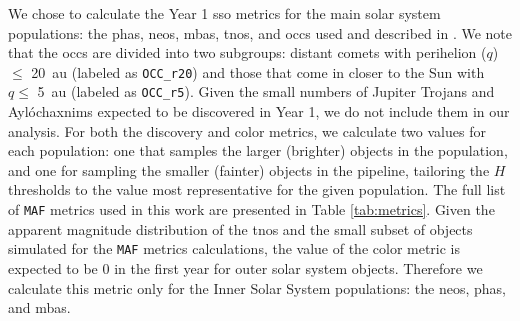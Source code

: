 \documentclass[preprintm,linenumbers]{aastex631}
\newcommand{\maf}{\texttt{MAF}\xspace}
\newcommand{\occrfive}{\texttt{OCC\_r5}\xspace}
\newcommand{\occrtwenty}{\texttt{OCC\_r20}\xspace}
\begin{document}
We chose to calculate the Year 1 \gls*{sso} metrics for the main solar system populations: the \glspl*{pha}, \glspl*{neo}, \glspl*{mba}, \glspl*{tno}, and \glspl*{occ} used and described in \cite{schwambTuningLegacySurvey2023}. 
We note that the \glspl*{occ} are divided into two subgroups: distant comets with perihelion ($q$) $\le$ 20\ au (labeled as \occrtwenty) and those that come in closer to the Sun with $q \le$ 5\ au (labeled as \occrfive). %
Given the small numbers of Jupiter Trojans and \textquotesingle Ayl\'{o}\textquotesingle chaxnims \citep[Inner Venus objects;][]{bolinDiscoveryCharacterizationKilometre2022,2025Icar..42516333B} expected to be discovered in Year 1, we do not include them in our analysis. 
For both the discovery and color metrics, we calculate two values for each population: one that samples the larger (brighter) objects in the population, and one for sampling the smaller (fainter) objects in the pipeline, tailoring the $H$ thresholds to the value most representative for the given population. 
The full list of \maf metrics used in this work are presented in Table \ref{tab:metrics}. 
Given the apparent magnitude distribution of the \glspl*{tno} and the small subset of objects simulated for the \maf metrics calculations, the value of the color metric is expected to be 0 in the first year for outer solar system objects. 
Therefore we calculate this metric only for the Inner Solar System populations: the \glspl*{neo}, \glspl*{pha}, and \glspl*{mba}. 


		
		
		
\end{document}
